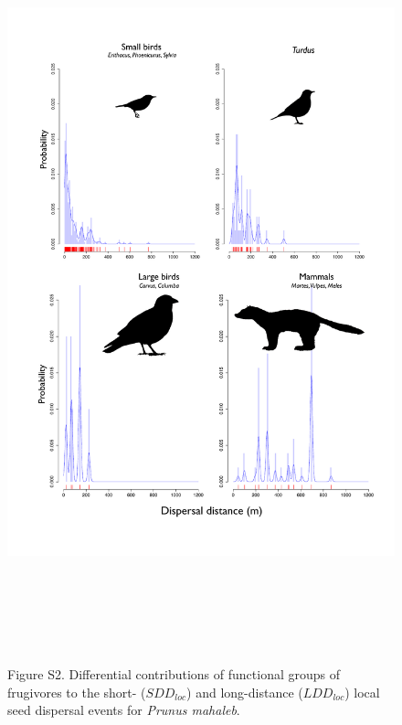 \documentclass[a4paper, 12pt]{article}
\begin{document}
\begin{figure}[htbp]
\centerline{\includegraphics[height=22cm]{FigS2.pdf}}
%
\caption*{Figure S2. Differential contributions of functional groups of frugivores to the short- ($SDD_{loc}$) and long-distance ($LDD_{loc}$) local seed dispersal events for \textit{Prunus mahaleb}.}
\end{figure}

\newpage 
\newpage 



	
\end{document}
